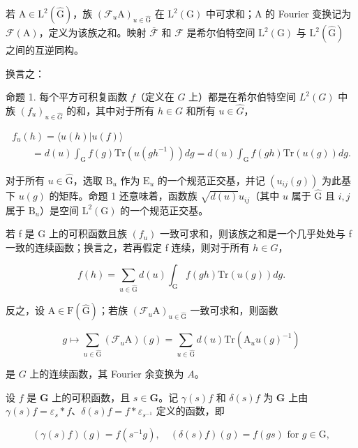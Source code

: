 若 \(\mathrm{A} \in \mathrm{L}^2(\hat{\mathrm{G}})\)，族 \((\mathcal{F}_u\mathrm{A})_{u \in \hat{\mathrm{G}}}\) 在 \(\mathrm{L}^2(\mathrm{G})\) 中可求和；\(\mathrm{A}\) 的 Fourier 变换记为 \(\mathcal{F}(\mathrm{A})\)，定义为该族之和。映射 \(\overline{\mathcal{F}}\) 和 \(\mathcal{F}\) 是希尔伯特空间 \(\mathrm{L}^2(\mathrm{G})\) 与 \(\mathrm{L}^2(\hat{\mathrm{G}})\) 之间的互逆同构。

换言之：

命题 1. 每个平方可积复函数 \(f\)（定义在 \(G\) 上）都是在希尔伯特空间 \(L^2(G)\) 中族 \((f_u)_{u\in \hat{G}}\) 的和，其中对于所有 \(h\in G\) 和所有 \(u\in \hat{G}\)，

\[
\begin{array}{l} f _ {u} (h) = \langle u (h) | u (f) \rangle \\ \qquad = d (u) \int_ {\mathrm{G}} f (g) \mathrm{Tr} (u (g h ^ {- 1}))   d g = d (u) \int_ {\mathrm{G}} f (g h) \mathrm{Tr} (u (g))   d g. \end{array}\tag{10}
\]

对于所有 \(u \in \hat{\mathrm{G}}\)，选取 \(\mathrm{B}_u\) 作为 \(\mathrm{E}_u\) 的一个规范正交基，并记 \((u_{ij}(g))\) 为此基下 \(u(g)\) 的矩阵。命题 1 还意味着，函数族 \(\sqrt{d(u)} u_{ij}\)（其中 \(u\) 属于 \(\hat{\mathrm{G}}\) 且 \(i,j\) 属于 \(\mathrm{B}_u\)）是空间 \(\mathrm{L}^2 (\mathrm{G})\) 的一个规范正交基。

若 f 是 G 上的可积函数且族 \((f_{u})\) 一致可求和，则该族之和是一个几乎处处与 f 一致的连续函数；换言之，若再假定 f 连续，则对于所有 \(h \in G\)，

\[
f (h) = \sum_ {u \in \hat {\mathrm{G}}} d (u) \int_ {\mathrm{G}} f (g h) \mathrm{Tr} (u (g))   d g.\tag{11}
\]

反之，设 \(\mathrm{A} \in \mathrm{F}(\hat{\mathrm{G}})\)；若族 \((\mathcal{F}_u\mathrm{A})_{u \in \hat{\mathrm{G}}}\) 一致可求和，则函数

\[
g \mapsto \sum_ {u \in \hat {\mathrm{G}}} (\mathcal {F} _ {u} \mathrm{A}) (g) = \sum_ {u \in \hat {\mathrm{G}}} d (u) \mathrm{Tr} (\mathrm{A} _ {u} u (g) ^ {- 1})
\]

是 \(G\) 上的连续函数，其 Fourier 余变换为 \(A\)。

设 \(f\) 是 \(\mathbf{G}\) 上的可积函数，且 \(s \in \mathbf{G}\)。记 \(\gamma(s)f\) 和 \(\delta(s)f\) 为 \(\mathbf{G}\) 上由 \(\gamma(s)f = \varepsilon_s * f\)、\(\delta(s)f = f * \varepsilon_{s^{-1}}\) 定义的函数，即

\[
(\gamma (s) f) (g) = f (s ^ {- 1} g), \quad (\delta (s) f) (g) = f (g s) \text { for } g \in \mathrm{G},
\]

